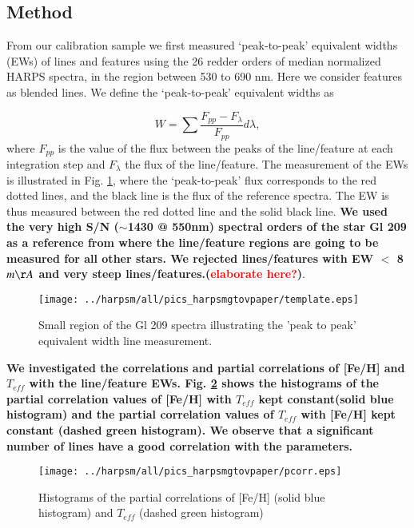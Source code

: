 \documentclass[structabstract]{aa}
\begin{document}
\subsection{Method}

From our calibration sample we first measured `peak-to-peak' equivalent widths (EWs) of lines and features using the 26 redder orders of median normalized HARPS spectra, in the region between 530 to 690 nm. Here we consider features as blended lines. We define the `peak-to-peak' equivalent widths as

\begin{equation}
W = \sum{\frac{F_{pp}-F_{\lambda}}{F_{pp}}d\lambda},
\label{ew}
\end{equation}
where $F_{pp}$ is the value of the flux between the peaks of the line/feature at each integration step and $F_{\lambda}$ the flux of the line/feature. The measurement of the EWs is illustrated in Fig. \ref{spec}, where the `peak-to-peak' flux corresponds to the red dotted lines, and the black line is the flux of the reference spectra. The EW is thus measured between the red dotted line and the solid black line.  \textbf{We used the very high S/N ($\sim$1430 @ 550nm) spectral orders of the star Gl 209 as a reference from where the line/feature regions are going to be measured for all other stars. We rejected lines/features with EW $<$ 8 $m\AA$ and very steep lines/features.(\textcolor{red}{elaborate here?})}.

\begin{figure}[h]
\begin{center}
\texttt{[image: ../harpsm/all/pics\_harpsmgtovpaper/template.eps]}
\end{center}
\caption{Small region of the Gl 209 spectra illustrating the 'peak to peak' equivalent width line measurement.}
\label{spec}
\end{figure}


 \textbf{We investigated the correlations and partial correlations of [Fe/H] and $T_{eff}$ with the line/feature EWs. Fig. \ref{pcorr} shows the histograms of the partial correlation values of [Fe/H] with $T_{eff}$ kept constant(solid blue histogram) and the partial correlation values of $T_{eff}$ with [Fe/H] kept constant (dashed green histogram). We observe that a significant number of lines have a good correlation with the parameters.}

\begin{figure}[h]
\begin{center}
\texttt{[image: ../harpsm/all/pics\_harpsmgtovpaper/pcorr.eps]}
\end{center}
\caption{Histograms of the partial correlations of [Fe/H] (solid blue histogram) and $T_{eff}$ (dashed green histogram) }
\label{pcorr}
\end{figure}
\end{document}
